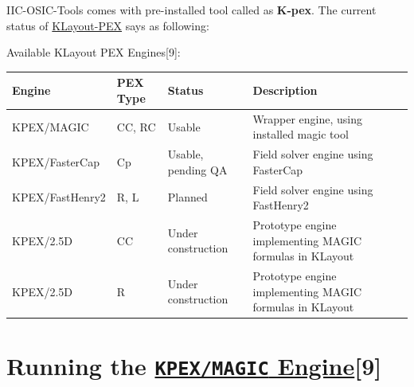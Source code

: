 \documentclass[
  11pt,
  a4paper,
  oneside]{scrbook}
\begin{document}
IIC-OSIC-Tools comes with pre-installed tool called as \textbf{K-pex}.
The current status of
\href{https://martinjankoehler.github.io/klayout-pex-website/doc/doc.html\#sec-into-klayout-pex-prototype-status}{KLayout-PEX}
says as following:

Available KLayout PEX Engines{[}9{]}:

\begin{longtable}[]{@{}
  >{\raggedright\arraybackslash}p{}
  >{\raggedright\arraybackslash}p{}
  >{\raggedright\arraybackslash}p{}
  >{\raggedright\arraybackslash}p{}@{}}
\toprule\noalign{}
\begin{minipage}[b]{\linewidth}\raggedright
Engine
\end{minipage} & \begin{minipage}[b]{\linewidth}\raggedright
PEX Type
\end{minipage} & \begin{minipage}[b]{\linewidth}\raggedright
Status
\end{minipage} & \begin{minipage}[b]{\linewidth}\raggedright
Description
\end{minipage} \\
\midrule\noalign{}
\endhead
\bottomrule\noalign{}
\endlastfoot
KPEX/MAGIC & CC, RC & Usable & Wrapper engine, using installed magic
tool \\
KPEX/FasterCap & Cp & Usable, pending QA & Field solver engine using
FasterCap \\
KPEX/FastHenry2 & R, L & Planned & Field solver engine using
FastHenry2 \\
KPEX/2.5D & CC & Under construction & Prototype engine implementing
MAGIC formulas in KLayout \\
KPEX/2.5D & R & Under construction & Prototype engine implementing MAGIC
formulas in KLayout \\
\end{longtable}

\section{\texorpdfstring{Running the
\href{https://iic-jku.github.io/klayout-pex-website/doc/doc.html\#sec-kpex-magic}{\texttt{KPEX/MAGIC}
Engine}{[}9{]}}{Running the KPEX/MAGIC Engine{[}9{]}}}\label{running-the-kpexmagic-enginekpex}
\end{document}
